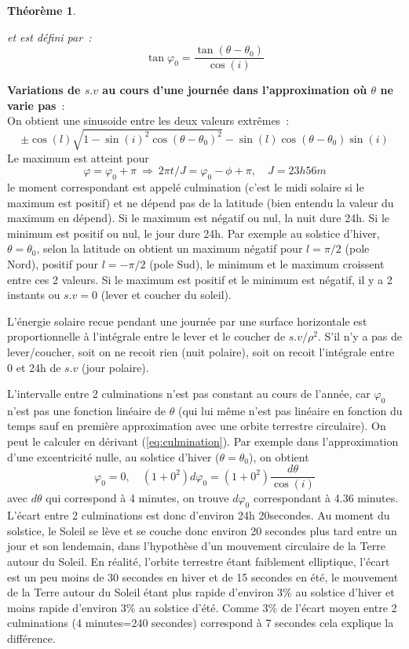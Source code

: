 \documentclass[a4paper,11pt]{article}
\newtheorem{thm}{Théorème}
\begin{document}
\begin{giacjshere}
\begin{thm}
\begin{itemize}
et est d\'efini par~:
\begin{equation} \label{eq:culmination}
\tan \varphi_0 = \frac{\tan(\theta-\theta_0)}{\cos(i)} 
\end{equation}
\end{itemize}
\end{thm}
{\bf Variations de $s.v$ au cours d'une journ\'ee dans l'approximation o\`u
$\theta$ ne varie pas}~:\\
On obtient une sinusoide entre les deux valeurs extr\^emes~:
\[ \pm \cos(l) \sqrt{1 - \sin(i)^2 \cos(\theta-\theta_0)^2 } -
 \sin(l) \cos(\theta-\theta_0)\sin(i) \]
Le maximum est atteint pour 
\[ \varphi=\varphi_0+ \pi \ \Rightarrow \ 
2 \pi t/J = \varphi_0 - \phi + \pi, \quad J=23h56m \]
le moment correspondant est appel\'e culmination (c'est le midi
solaire si le maximum est positif) et ne d\'epend pas de la latitude
(bien entendu la valeur du maximum en d\'epend).
Si le maximum est n\'egatif ou nul, la nuit dure 24h.
Si le minimum est positif ou nul, le jour dure 24h.
Par exemple au solstice d'hiver, $\theta=\theta_0$, selon la latitude
on obtient un maximum n\'egatif pour $l=\pi/2$ (pole Nord), positif 
pour $l=-\pi/2$ (pole Sud), le minimum et le maximum croissent 
entre ces 2 valeurs.
Si le maximum est positif et le minimum est n\'egatif, il y a
2 instants ou $s.v=0$ (lever et coucher du soleil).

L'\'energie solaire recue pendant une journ\'ee par une surface
horizontale est proportionnelle \`a l'int\'egrale entre le lever
et le coucher de $s.v/\rho^2$. S'il n'y a pas de lever/coucher, 
soit on ne recoit rien (nuit polaire),
soit on recoit l'int\'egrale entre 0 et 24h de $s.v$ (jour polaire).

L'intervalle entre 2 culminations n'est pas constant au cours de
l'ann\'ee, car $\varphi_0$ n'est pas une fonction lin\'eaire de
$\theta$ (qui lui m\^eme n'est pas lin\'eaire en fonction du temps
sauf en premi\`ere approximation avec une orbite terrestre
circulaire). On peut le calculer en d\'erivant (\ref{eq:culmination}).
Par exemple dans l'approximation d'une excentricit\'e nulle,
au solstice d'hiver ($\theta=\theta_0$), on obtient
\[ \varphi_0= 0, \quad (1+0^2) d\varphi_0 = (1+0^2)\frac{d\theta} {\cos(i)} \]
avec $d\theta$ qui correspond \`a 4 minutes, on trouve $d\varphi_0$
correspondant \`a 4.36 minutes.
L'\'ecart entre 2 culminations
est donc d'environ 24h 20secondes. 
Au moment du solstice, le Soleil se l\`eve et se couche donc environ
20 secondes plus tard entre un jour et son lendemain, dans 
l'hypothèse d'un mouvement circulaire de la Terre autour du Soleil. 
En réalité, l'orbite terrestre étant faiblement elliptique,
l'écart est un peu moins de 30 secondes en hiver et de 15 secondes en été, 
le mouvement de la Terre autour du Soleil étant plus rapide d'environ
3\% au solstice d'hiver et moins rapide d'environ 3\% au
solstice d'été. Comme 3\%
de l'écart moyen entre 2 culminations (4 minutes=240 secondes) 
correspond à 7 secondes cela explique la différence.


\end{giacjshere}
\end{document}
